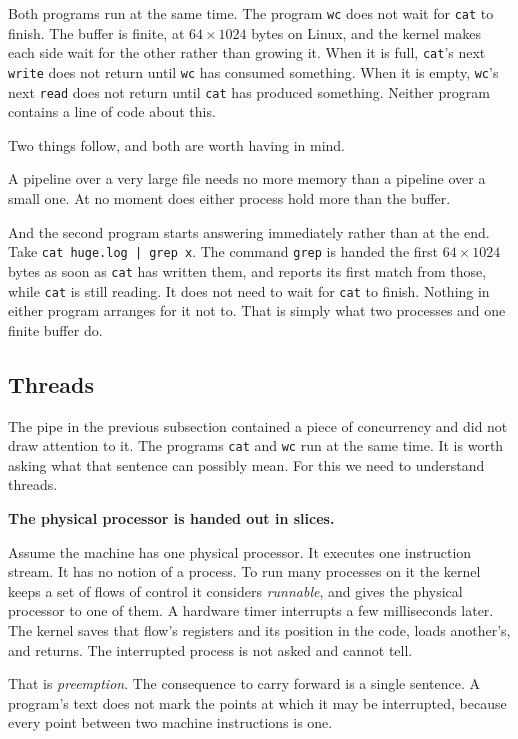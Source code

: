 \documentclass[11pt,a4paper]{article}
\begin{document}
Both programs run at the same time. The program \texttt{wc} does not wait for \texttt{cat} to
finish. The
buffer is finite, at $64 \times 1024$ bytes on Linux, and the kernel makes each side wait for the
other rather than growing it. When it is full, \texttt{cat}'s next \texttt{write} does not return
until \texttt{wc} has consumed something. When it is empty, \texttt{wc}'s next \texttt{read} does
not return until \texttt{cat} has produced something. Neither program contains a line of code about
this.

Two things follow, and both are worth having in mind.

A pipeline over a very large file needs no more memory than a pipeline over a small one. At no
moment does either process hold more than the buffer.

And the second program starts answering immediately rather than at the end. Take
\texttt{cat huge.log | grep x}. The command \texttt{grep} is handed the first $64 \times 1024$
bytes as soon as \texttt{cat} has written them, and reports its first match from those, while
\texttt{cat} is still reading. It does not need to wait for \texttt{cat} to finish. Nothing in
either program arranges for it not to. That is simply what two processes and one finite buffer
do.

\subsection{Threads}
\label{sec:threads}

The pipe in the previous subsection contained a piece of concurrency and did not draw attention to
it. The programs \texttt{cat} and \texttt{wc} run at the same time. It is worth asking what that
sentence can possibly mean. For this we need to understand threads.

\textbf{The physical processor is handed out in slices.}

Assume the machine has one physical processor. It executes one instruction stream. It has no notion
of a process. To run many processes on it the kernel keeps a set of flows of control it considers
\emph{runnable}, and gives the physical processor to one of them. A hardware timer interrupts a few milliseconds later. The kernel saves
that flow's registers and its position in the code, loads another's, and returns. The interrupted
process is not asked and cannot tell.

That is \emph{preemption}. The consequence to carry forward is a single sentence. A program's text
does not mark the points at which it may be interrupted, because every point between two machine
instructions is one.
\end{document}
